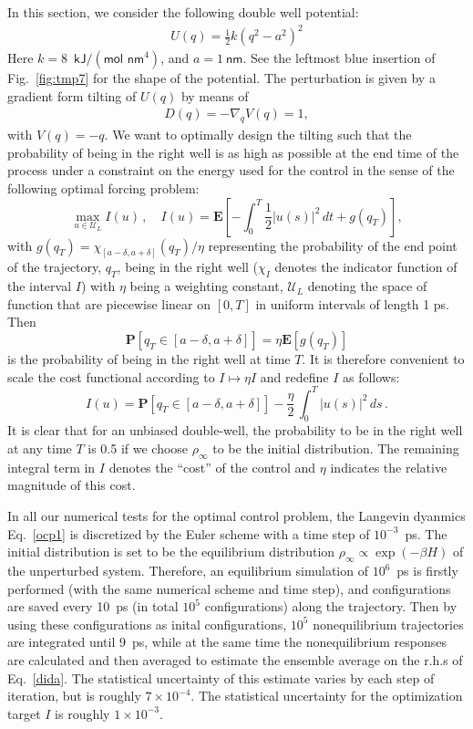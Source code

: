 \documentclass[]{tMPH2e}
\newcommand{\recheck}[1]{{\color{red} #1}}
\newcommand{\bE}{{\mathbf E}}
\newcommand{\bP}{{\mathbf P}}
\begin{document}
In this section, we consider the following double well potential:
\begin{align}
  U(q) = \frac12 k ( q^2 - a^2)^2
\end{align}
Here $k = 8$~$\textsf{kJ} / (\textsf{mol nm}^4)$, and $ a = 1\
\textsf{nm}$.  See the leftmost blue insertion of Fig.~\ref{fig:tmp7} for
the shape of the potential.
The perturbation is given by a gradient form tilting of $U( q)$ by means of
\begin{align}
   D( q) = -\nabla_{ q} V( q) = 1,
\end{align}
with $V( q) = - q$. We want to
optimally design the tilting such that the probability
of being in the right well is as high as possible 
at the end time of the process under a constraint on the energy used for the control in the sense of
the following optimal forcing problem:
\[
 \max_{u\in{\mathcal U}_{L}}I(u)\,,\quad I(u) = \bE\left[ -\int_{0}^{T} \frac{1}{2}|u(s)|^{2}\,dt + g(q_T) \right],
\]
with $g(q_T)=\chi_{[a-\delta,a+\delta]}(q_T)/\eta$ representing the probability of the end point of the trajectory, $ q_T$, being in the right well ($\chi_I$ denotes the indicator function of the interval $I$) with $\eta$ being a weighting constant, ${\mathcal U}_{L}$ denoting the space of function that are piecewise linear  on $[0, T]$ in uniform intervals of length 1 \textsf{ps}. Then
\[
\bP[q_{T}\in[a-\delta,a+\delta] ] = \eta \bE[g(q_T)]
\]
is the probability of being in the right well at time $T$. It is therefore convenient to scale the cost functional according to $I\mapsto\eta I$ and redefine $I$ as follows: 
\[
 I(u) = \bP[q_{T}\in[a-\delta,a+\delta] ] - \frac{\eta}{2}\,
   \int_0^T |u(s)|^2\, ds\,.
   \]
It is clear that for an unbiased double-well, the probability to be in the right well at any time $T$ is 0.5 if we choose $\rho_{\infty}$ to be the initial distribution. The remaining integral term in $I$ denotes the ``cost'' of the control and $\eta$  indicates the relative magnitude of this
cost. 

\recheck{ In all our numerical tests for the optimal control problem, the
  Langevin dyanmics Eq.~\eqref{ocp1} is discretized by the Euler
  scheme with a time step of $10^{-3}$~\textsf{ps}.
  The initial distribution is set to be the
  equilibrium distribution $\rho_\infty\propto\exp(-\beta H)$ of the unperturbed system.
  Therefore, an equilibrium simulation of $10^6$~\textsf{ps} is firstly performed (with
  the same numerical scheme and time step), and
  configurations are saved every 10~\textsf{ps} (in total $10^5$
  configurations) along the trajectory.
  Then by using these configurations as inital configurations,
  $10^5$ nonequilibrium
  trajectories are integrated until 9~\textsf{ps}, while at the same time
  the nonequilibrium responses are calculated and then averaged to
  estimate the ensemble average on the r.h.s of Eq.~\eqref{dida}.
  The statistical
  uncertainty of this estimate varies by each step of iteration, but
  is roughly $7\times10^{-4}$.  The statistical uncertainty for the 
  optimization target $I$ is roughly $1\times10^{-3}$.
}
\end{document}
